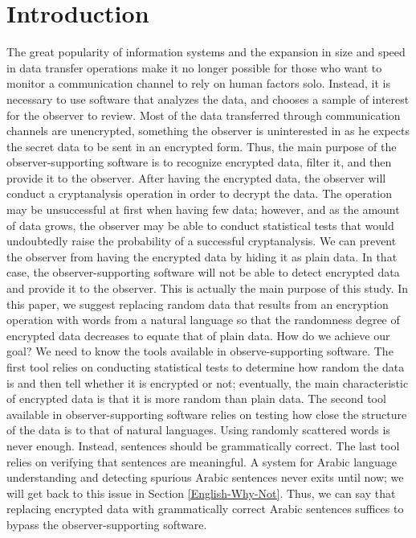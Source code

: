 \documentclass{acm_proc_article-sp}
\begin{document}
\section{Introduction}\label{Introduction}
The great popularity of information systems and the expansion in size and speed in data transfer operations make it no longer possible for those who want to monitor a communication channel to rely on human factors solo. Instead, it is necessary to use software that analyzes the data, and chooses a sample of interest for the observer to review. Most of the data transferred through communication channels are unencrypted, something the observer is uninterested in as he expects the secret data to be sent in an encrypted form. Thus, the main purpose of the observer-supporting software is to recognize encrypted data, filter it, and then provide it to the observer.
After having the encrypted data, the observer will conduct a cryptanalysis operation in order to decrypt the data. The operation may be unsuccessful at first when having few data; however, and as the amount of data grows, the observer may be able to conduct statistical tests that would undoubtedly raise the probability of a successful cryptanalysis. We can prevent the observer from having the encrypted data by hiding it as plain data. In that case, the observer-supporting software will not be able to detect encrypted data and provide it to the observer. This is actually the main purpose of this study. In this paper, we suggest replacing random data that results from an encryption operation with words from a natural language so that the randomness degree of encrypted data decreases to equate that of plain data. How do we achieve our goal? We need to know the tools available in observe-supporting software. The first tool relies on conducting statistical tests to determine how random the data is and then tell whether it is encrypted or not; eventually, the main characteristic of encrypted data is that it is more random than plain data. The second tool available in observer-supporting software relies on testing how close the structure of the data is to that of natural languages. Using randomly scattered words is never enough. Instead, sentences should be grammatically correct. The last tool relies on verifying that sentences are meaningful. A system for Arabic language understanding and detecting spurious Arabic sentences never exits until now; we will get back to this issue in Section \ref{English-Why-Not}. Thus, we can say that replacing encrypted data with grammatically correct Arabic sentences suffices to bypass the observer-supporting software.
\end{document}
